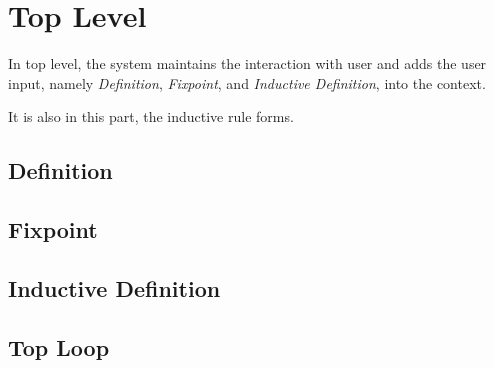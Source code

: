 \section{Top Level}

In top level, the system maintains the interaction with user and
adds the user input, namely \textit{Definition}, \textit{Fixpoint}, and \textit{Inductive Definition}, 
into the context.\par
It is also in this part, the inductive rule forms.

\subsection{Definition}

\subsection{Fixpoint}

\subsection{Inductive Definition}

\subsection{Top Loop}
